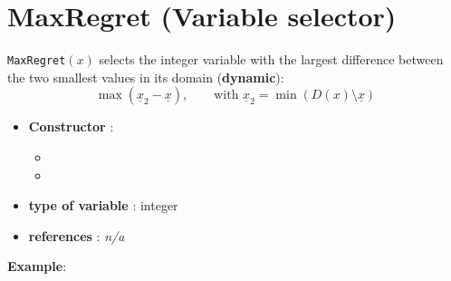 \section{MaxRegret (Variable selector)}\label{maxregret:maxregretvarselector}\hypertarget{maxregret:maxregretvarselector}{}
\begin{notedef}
  \texttt{MaxRegret}$(x)$ selects the integer variable with the largest difference between the two smallest values in its domain (\textbf{dynamic}):
$$\max(\underline{x}_2 - \underline{x}),\qquad\text{with } \underline{x}_2=\min(D(x)\setminus\underline{x})$$
\end{notedef}

\begin{itemize}
	\item \textbf{Constructor} : 
	\begin{itemize}
	\item {}
	\item {}
	\end{itemize}	
	\item \textbf{type of variable} : integer
	\item \textbf{references} : \emph{n/a}
\end{itemize}

\textbf{Example}:
%

